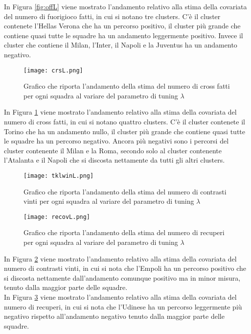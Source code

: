 In Figura \ref{fig:offL} viene mostrato l'andamento relativo alla stima della covariata del numero di fuorigioco fatti, in cui si notano tre clusters. C'è il cluster contenete l'Hellas Verona che ha un percorso positivo, il cluster più grande che contiene quasi tutte le squadre ha un andamento leggermente positivo. Invece il cluster che contiene il Milan, l'Inter, il Napoli e la Juventus ha un andamento negativo.

\begin{figure}[htbp]
	\begin{center}
		\texttt{[image: crsL.png]}
		\caption{Grafico che riporta l'andamento della stima del numero di cross fatti per ogni squadra al variare del parametro di tuning $\lambda$} \label{fig:crsL}
	\end{center}
\end{figure}

In Figura \ref{fig:crsL} viene mostrato l'andamento relativo alla stima della covariata del numero di cross fatti, in cui si notano quattro clusters. C'è il cluster contenete il Torino che ha un andamento nullo, il cluster più grande che contiene quasi tutte le squadre ha un percorso negativo. Ancora più negativi sono i percorsi del cluster contenente il Milan e la Roma, secondo solo al cluster contenente l'Atalanta e il Napoli che si discosta nettamente da tutti gli altri clusters.

\begin{figure}[htbp]
	\begin{center}
		\texttt{[image: tklwinL.png]}
		\caption{Grafico che riporta l'andamento della stima del numero di contrasti vinti per ogni squadra al variare del parametro di tuning $\lambda$} \label{fig:tklwinL}
	\end{center}
\end{figure}

\begin{figure}[htbp]
	\begin{center}
		\texttt{[image: recovL.png]}
		\caption{Grafico che riporta l'andamento della stima del numero di recuperi per ogni squadra al variare del parametro di tuning $\lambda$} \label{fig:recovL}
	\end{center}
\end{figure}
In Figura \ref{fig:tklwinL} viene mostrato l'andamento relativo alla stima della covariata del numero di contrasti vinti, in cui si nota che l'Empoli ha un percorso positivo che si discosta nettamente dall'andamento comunque positivo ma in minor misura, tenuto dalla maggior parte delle squadre.\\
In Figura \ref{fig:recovL} viene mostrato l'andamento relativo alla stima della covariata del numero di recuperi, in cui si nota che l'Udinese ha un percorso leggermente più negativo rispetto all'andamento negativo tenuto dalla maggior parte delle squadre.\\

